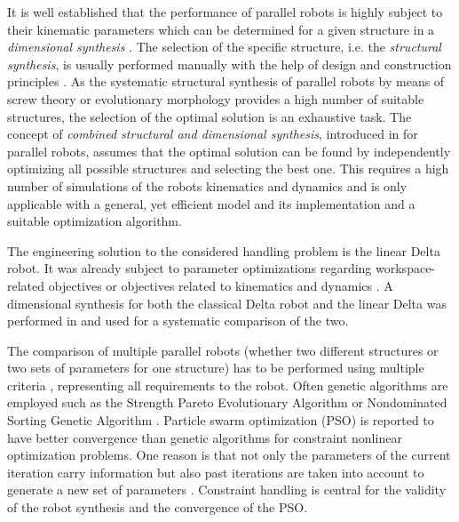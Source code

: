 \documentclass{svproc}
\begin{document}
It is well established that the performance of parallel robots is highly subject to their kinematic parameters which can be determined for a given structure in a \emph{dimensional synthesis} \cite{Merlet2006}.
The selection of the specific structure, i.e. the \emph{structural synthesis}, is usually performed manually with the help of design and construction principles \cite{FrindtKreHes2010}.
As the systematic structural synthesis of parallel robots by means of screw theory \cite{KongGos2007} or evolutionary morphology \cite{Gogu2008} provides a high number of suitable structures, the selection of the optimal solution is an exhaustive task.
The concept of \emph{combined structural and dimensional synthesis}, introduced in \cite{Krefft2006} for parallel robots, assumes that the optimal solution can be found by independently optimizing all possible structures and selecting the best one.
This requires a high number of simulations of the robots kinematics and dynamics and is only applicable with a general, yet efficient model and its implementation and a suitable optimization algorithm.

The engineering solution to the considered handling problem is the linear Delta robot.
It was already subject to parameter optimizations regarding workspace-related objectives \cite{StockMil2003} or objectives related to kinematics and dynamics \cite{KelaiaiaComZaa2012}.
A dimensional synthesis for both the classical Delta robot and the linear Delta was performed in \cite{Krefft2006} and used for a systematic comparison of the two.

The comparison of multiple parallel robots (whether two different structures or two sets of parameters for one structure) has to be performed using multiple criteria \cite{Merlet2006}, representing all requirements to the robot.
Often genetic algorithms are employed such as the Strength Pareto Evolutionary Algorithm \cite{KelaiaiaComZaa2012,Krefft2006} or Nondominated Sorting Genetic Algorithm \cite{JamwalHusXie2015}.
Particle swarm optimization (PSO) is reported to have better convergence than genetic algorithms for constraint nonlinear optimization problems.
One reason is that not only the parameters of the current iteration carry information but also past iterations are taken into account to generate a new set of parameters \cite{CoelloPulLec2004}. 
Constraint handling \cite{Mezura-MontesCoe2011} is central for the validity of the robot synthesis and the convergence of the PSO.
\end{document}
